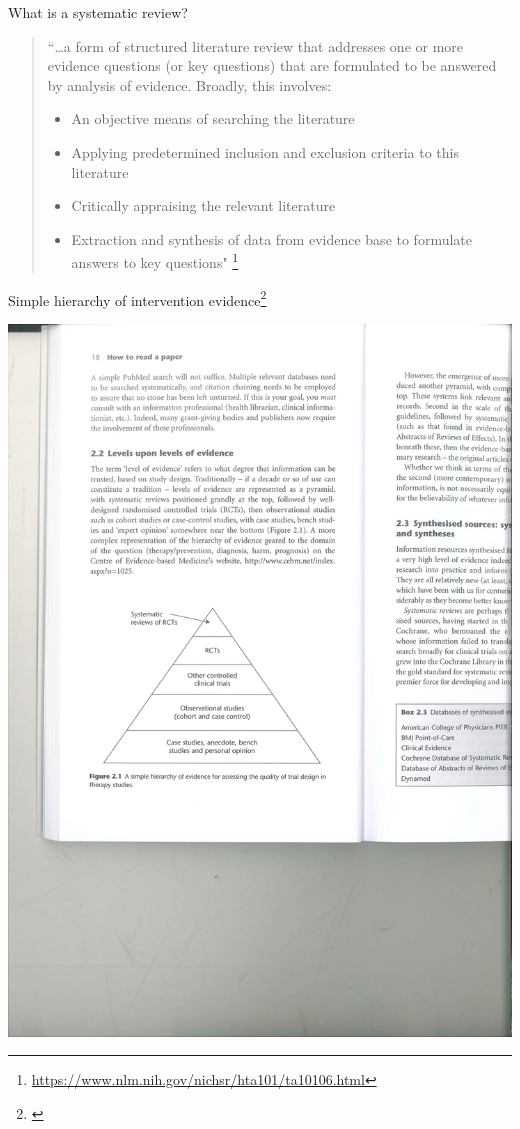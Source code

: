 \documentclass{beamer}
\begin{document}
% 
\begin{frame}{What is a systematic review?}
\begin{quote}
``\dots a form of structured literature review that addresses one or more evidence questions (or key questions) that are formulated to be answered by analysis of evidence.  Broadly, this involves:
	\begin{itemize}
	\item An objective means of searching the literature
	\item Applying predetermined inclusion and exclusion criteria to this literature
	\item Critically appraising the relevant literature
	\item Extraction and synthesis of data from evidence base to formulate answers to key questions"
	\footnote{\tiny{{\url{https://www.nlm.nih.gov/nichsr/hta101/ta10106.html}}}}
	\end{itemize}
\end{quote}
\end{frame}

% 
\begin{frame}{Simple hierarchy of intervention evidence\footnote{\tiny{\citet[p. 18]{Greenhalgh2010}}}}
	\begin{center}
	\includegraphics[width=.9\textwidth]{images/evidence_hierarchy_greenhalgh_4th.pdf}
	\end{center}
\end{frame}
\end{document}
